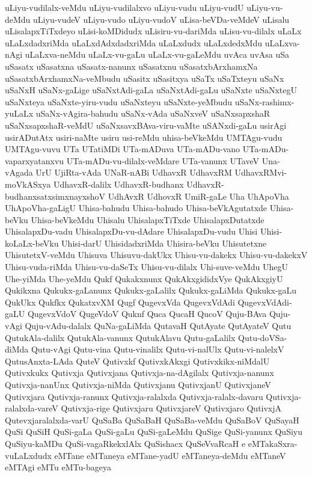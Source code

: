 {uLiyu-vudilalx-veMdu
uLiyu-vudilalxvo
uLiyu-vudu
uLiyu-vudU
uLiyu-vu-deMdu
uLiyu-vudeV
uLiyu-vudo
uLiyu-vudoV
uLisa-beVDa-veMdeV
uLisalu
uLisalapxTiTxdeyo
uLisi-koMDidudx
uLisiru-vu-dariMda
uLisu-vu-dilalx
uLaLx
uLaLxdadxriMda
uLaLxdAdxdadxriMda
uLaLxdudx
uLaLxdedxMdu
uLaLxva-nAgi
uLaLxva-neMdu
uLaLx-vu-gaLu
uLaLx-vu-gaLeMdu
uvAca
uvAsa
uSa
uSasatx
uSasatxna
uSasatx-nanunx
uSasatxnu
uSasatxbArxhamxNa
uSasatxbArxhamxNa-veMbudu
uSasitx
uSasitxya
uSaTx
uSaTxteyu
uSaNx
uSaNxH
uSaNx-gaLige
uSaNxtAdi-gaLa
uSaNxtAdi-gaLu
uSaNxte
uSaNxtegU
uSaNxteya
uSaNxte-yiru-vudu
uSaNxteyu
uSaNxte-yeMbudu
uSaNx-rashimx-yuLaLx
uSaNx-vAgira-bahudu
uSaNx-vAda
uSaNxveV
uSaNxsapxshaR
uSaNxsapxshaR-veMdU
uSaNxsavxBAva-viru-vaMte
uSANxdi-gaLu
usirAgi
usirADutAtx
usiri-naMte
usiru
usi-reMdu
uhisa-beVkeMdu
UMTAgu-vudu
UMTAgu-vuvu
UTa
UTatiMDi
UTa-mADuva
UTa-mADu-vano
UTa-mADu-vaparxyatanxvu
UTa-mADu-vu-dilalx-veMdare
UTa-vanunx
UTaveV
Una-vAgada
UrU
UjiRta-vAda
UNaR-nABi
UdhavxR
UdhavxRM
UdhavxRMvi-moVkASxya
UdhavxR-dalilx
UdhavxR-budhanx
UdhavxR-budhanxsatxsimxnayxshoV
UdhAvxR
UdhovxR
UmiR-gaLe
Uha
UhApoVha
UhApoVha-gaLigU
Uhisa-bahudu
Uhisa-bahudo
Uhisa-beVkAgutatxde
Uhisa-beVku
Uhisa-beVkeMdu
Uhisalu
UhisalapxTiTxde
UhisalapxDutatxde
UhisalapxDu-vadu
UhisalapxDu-vu-dAdare
UhisalapxDu-vudu
Uhisi
Uhisi-koLaLx-beVku
Uhisi-darU
UhisidadxriMda
Uhisira-beVku
Uhisutetxne
UhisutetxV-veMdu
Uhisuva
Uhisuvu-dakUkx
Uhisu-vu-dakekx
Uhisu-vu-dakekxV
Uhisu-vuda-riMda
Uhisu-vu-daSeTx
Uhisu-vu-dilalx
Uhi-suve-veMdu
UhegU
Uhe-yiMda
Uhe-yeMdu
Qukf
Qukakxnunx
QukAkxgididxVye
QukAkxgiyU
Qukikxna
Qukukx-gaLanunx
Qukukx-gaLalilx
Qukukx-gaLiMda
Qukukx-gaLu
QukUkx
Qukfkx
QukatxvXM
Qugf
QugevxVda
QugevxVdAdi
QugevxVdAdi-gaLU
QugevxVdoV
QugeVdoV
Quknf
Quca
QucaH
QucoV
Quju-BAva
Quju-vAgi
Quju-vAdu-dalalx
QuNa-gaLiMda
QutavaH
QutAyate
QutAyateV
Qutu
QutukAla-dalilx
QutukAla-vanunx
QutukAlavu
Qutu-gaLalilx
Qutu-doVSa-diMda
Qutu-vAgi
Qutu-vina
Qutu-vinalilx
Qutu-vi-nalUlx
Qutu-vi-nalelxV
QutusAnxta-LAda
QuteV
Qutivxkf
QutivxkAkxgi
Qutivxkikx-niMdalU
Qutivxkukx
Qutivxja
Qutivxjana
Qutivxja-na-dAgilalx
Qutivxja-nanunx
Qutivxja-nanUnx
Qutivxja-niMda
Qutivxjanu
QutivxjanU
QutivxjaneV
Qutivxjara
Qutivxja-ranunx
Qutivxja-ralalxda
Qutivxja-ralalx-davaru
Qutivxja-ralalxda-vareV
Qutivxja-rige
Qutivxjaru
QutivxjareV
Qutivxjaro
QutivxjA
Qutevxjaralalxda-varU
QuSaBa
QuSaBaH
QuSaBa-veMdu
QuSaBoV
QuSayaH
QuSi
QuSiH
QuSi-gaLa
QuSi-gaLu
QuSi-gaLeMdu
QuSige
QuSi-yanunx
QuSiyu
QuSiyu-kaMDu
QuSi-vagaRkekxlAlx
QuSishacx
QuSeVvaRcaH
e
eMTakaSxra-vuLaLxdudx
eMTane
eMTaneya
eMTane-yadU
eMTaneya-deMdu
eMTaneV
eMTAgi
eMTu
eMTu-bageya
}

